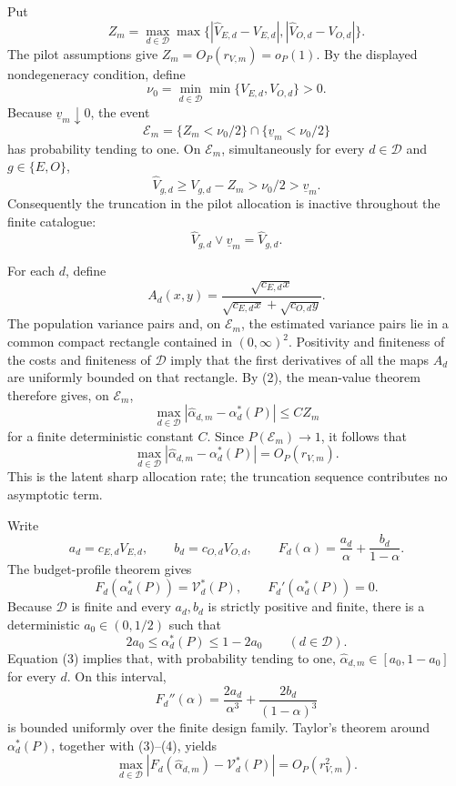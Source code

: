 Put
\[
 Z_m=\max_{d\in\mathcal D}\max\bigl\{
 |\widehat V_{E,d}-V_{E,d}|,
 |\widehat V_{O,d}-V_{O,d}|\bigr\}.
\]
The pilot assumptions give \(Z_m=O_P(r_{V,m})=o_P(1)\).  By the displayed nondegeneracy condition, define
\[
 \nu_0=\min_{d\in\mathcal D}\min\{V_{E,d},V_{O,d}\}>0.
\]
Because \(\underline v_m\downarrow0\), the event
\[
 \mathcal E_m
 =\{Z_m<\nu_0/2\}\cap\{\underline v_m<\nu_0/2\}
 \tag{1}
\]
has probability tending to one.  On \(\mathcal E_m\), simultaneously for every \(d\in\mathcal D\) and \(g\in\{E,O\}\),
\[
 \widehat V_{g,d}\ge V_{g,d}-Z_m>\nu_0/2>\underline v_m.
\]
Consequently the truncation in the pilot allocation is inactive throughout the finite catalogue:
\[
 \widehat V_{g,d}\vee\underline v_m=\widehat V_{g,d}.
 \tag{2}
\]

For each \(d\), define
\[
 A_d(x,y)=
 \frac{\sqrt{c_{E,d}x}}
 {\sqrt{c_{E,d}x}+\sqrt{c_{O,d}y}}.
\]
The population variance pairs and, on \(\mathcal E_m\), the estimated variance pairs lie in a common compact rectangle contained in \((0,\infty)^2\).  Positivity and finiteness of the costs and finiteness of \(\mathcal D\) imply that the first derivatives of all the maps \(A_d\) are uniformly bounded on that rectangle.  By (2), the mean-value theorem therefore gives, on \(\mathcal E_m\),
\[
 \max_{d\in\mathcal D}
 |\widehat\alpha_{d,m}-\alpha_d^*(P)|
 \le C Z_m
\]
for a finite deterministic constant \(C\).  Since \(P(\mathcal E_m)\to1\), it follows that
\[
 \max_{d\in\mathcal D}
 |\widehat\alpha_{d,m}-\alpha_d^*(P)|
 =O_P(r_{V,m}).
 \tag{3}
\]
This is the latent sharp allocation rate; the truncation sequence contributes no asymptotic term.

Write
\[
 a_d=c_{E,d}V_{E,d},\qquad b_d=c_{O,d}V_{O,d},\qquad
 F_d(\alpha)=\frac{a_d}{\alpha}+\frac{b_d}{1-\alpha}.
\]
The budget-profile theorem gives
\[
 F_d(\alpha_d^*(P))=\mathcal V_d^*(P),
 \qquad F_d'(\alpha_d^*(P))=0.
 \tag{4}
\]
Because \(\mathcal D\) is finite and every \(a_d,b_d\) is strictly positive and finite, there is a deterministic \(a_0\in(0,1/2)\) such that
\[
 2a_0\le\alpha_d^*(P)\le1-2a_0
 \qquad(d\in\mathcal D).
\]
Equation (3) implies that, with probability tending to one,
\(
\widehat\alpha_{d,m}\in[a_0,1-a_0]
\)
for every \(d\).  On this interval,
\[
 F_d''(\alpha)=\frac{2a_d}{\alpha^3}
 +\frac{2b_d}{(1-\alpha)^3}
\]
is bounded uniformly over the finite design family.  Taylor's theorem around \(\alpha_d^*(P)\), together with (3)--(4), yields
\[
 \max_{d\in\mathcal D}
 \left|F_d(\widehat\alpha_{d,m})-\mathcal V_d^*(P)\right|
 =O_P(r_{V,m}^2).
 \tag{5}
\]

